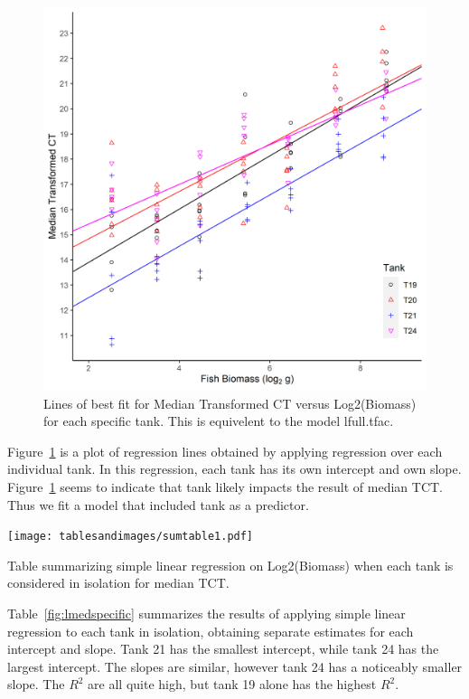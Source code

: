 \begin{figure}[H]
\includegraphics{Chapter3Images/ggplotnew2.png}
\caption{ Lines of best fit for Median Transformed CT versus Log2(Biomass) for each specific tank. This is equivelent to the model lfull.tfac.}
\label{fig:medct33}
\end{figure}

Figure~\ref{fig:medct33} is a plot of regression lines obtained by applying regression over each individual tank. In this regression, each tank has its own intercept and own slope. Figure~\ref{fig:medct33} seems to indicate that tank likely impacts the result of median TCT. Thus we fit a model that included tank as a predictor. 



\begin{table}[H]
\texttt{[image: tablesandimages/sumtable1.pdf]}
\caption{Table summarizing simple linear regression on Log2(Biomass) when each tank is considered in isolation for median TCT.}
\label{fig:lmedspecific}
\end{table}



Table~\ref{fig:lmedspecific} summarizes the results of applying simple linear regression to each tank in isolation, obtaining separate estimates for each intercept and slope. Tank 21 has the smallest intercept, while tank 24 has the largest intercept. The slopes are similar, however tank 24 has a noticeably smaller slope. The $R^{2}$ are all quite high, but tank 19 alone has the highest $R^{2}$. 



